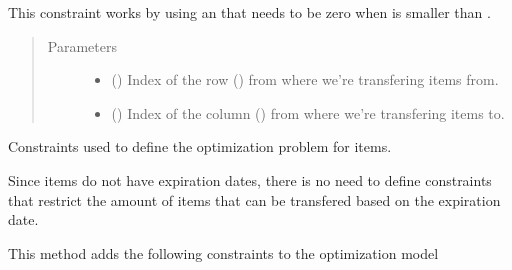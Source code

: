\documentclass[letterpaper,10pt,english]{sphinxmanual}
\begin{document}
\begin{fulllineitems}
\begin{fulllineitems}
This constraint works by using an  that needs to be zero when 
is smaller than .
\begin{quote}\begin{description}
\item[{Parameters}] \leavevmode\begin{itemize}
\item {} 
 () \textendash{} Index of the row () from where we’re transfering items from.

\item {} 
 () \textendash{} Index of the column () from where we’re transfering items to.

\end{itemize}

\end{description}\end{quote}

\end{fulllineitems}


\begin{fulllineitems}
\label{\detokenize{source/optimization.model:optimization.model.optimizer.OptimizationModel._nonlot_constraints}}
Constraints used to define the optimization problem for  items.

Since  items do not have expiration dates, there is no need to define
constraints that restrict the amount of items that can be transfered based on the
expiration date.

This method adds the following constraints to the optimization model

\end{fulllineitems}



\end{fulllineitems}
\end{document}

